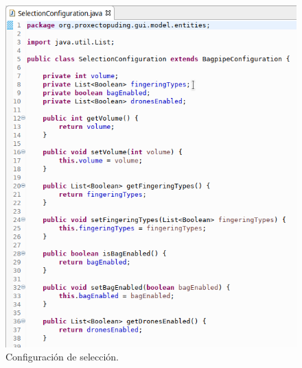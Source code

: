    \begin{figure}[htbp]
    \centering
    \includegraphics[scale=0.6, keepaspectratio=true]{./imagenes/selection-configuration.png}
    \caption{Configuración de selección.}
    \label{figura:SelectionConfiguration}
   \end{figure}
   
